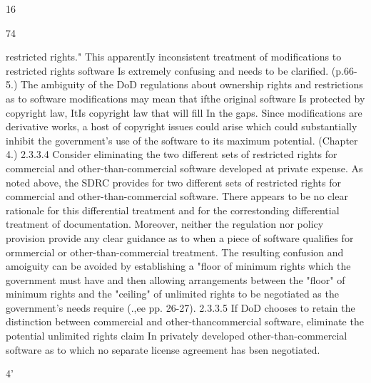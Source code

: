 \documentclass[12pt]{article}
\begin{document}
16

74

restricted rights." This apparentIy inconsistent treatment of modifications to restricted rights software
Is extremely confusing and needs to be clarified. (p.66-5.)
The ambiguity of the DoD regulations about ownership rights and restrictions as to software modifications may mean that ifthe original software Is protected by copyright law, ItIs copyright law that will fill
In the gaps. Since modifications are derivative works, a host of copyright issues could arise which
could substantially inhibit the government's use of the software to its maximum potential. (Chapter 4.)
2.3.3.4 Consider eliminating the two different sets of restricted rights for commercial and
other-than-commercial software developed at private expense.
As noted above, the SDRC provides for two different sets of restricted rights for commercial and
other-than-commercial software. There appears to be no clear rationale for this differential treatment
and for the correstonding differential treatment of documentation. Moreover, neither the regulation
nor policy provision provide any clear guidance as to when a piece of software qualifies for ormmercial or other-than-commercial treatment.
The resulting confusion and amoiguity can be avoided by establishing a "floor of minimum rights
which the government must have and then allowing arrangements between the "floor" of minimum
rights and the "ceiling" of unlimited rights to be negotiated as the government's needs require
(.,ee pp. 26-27).
2.3.3.5 If DoD chooses to retain the distinction between commercial and other-thancommercial software, eliminate the potential unlimited rights claim In privately developed
other-than-commercial software as to which no separate license agreement has bsen
negotiated.

4'
\end{document}
